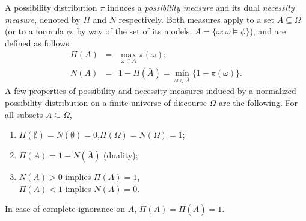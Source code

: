 \documentclass[conference]{IEEEtran}
\begin{document}
A possibility distribution $\pi$ induces a \emph{possibility
measure} and its dual \emph{necessity
measure}, denoted by $\Pi$ and $N$
respectively. Both measures apply to a set $A \subseteq\Omega$ (or to a
formula $\phi$, by way of the set of its models, $A = \{\omega : \omega \models \phi\}$),
and are defined as follows:
\begin{eqnarray}
  \Pi(A) &=& \max_{\omega\in A} \pi(\omega); \\
  N(A)   &=& 1 - \Pi(\bar{A}) = \min_{\omega\in \bar{A}} \{1 - \pi(\omega)\}.
\end{eqnarray}
%
A few properties of possibility and necessity measures 
induced by a normalized possibility distribution on a finite universe of
discourse $\Omega$ are the following. For all subsets $A\subseteq \Omega$,
\begin{enumerate}
  \item $\Pi(\emptyset) = N(\emptyset) = 0$,\quad $\Pi(\Omega) = N(\Omega) = 1$;
  \item $\Pi(A) = 1 - N(\bar{A})$ (duality);
  \item $N(A) > 0$ implies $\Pi(A) = 1$, \\
  \quad $\Pi(A) < 1$ implies $N(A) = 0$.
\end{enumerate}
In case of complete ignorance on $A$, $\Pi(A) = \Pi(\bar{A}) = 1$.
\end{document}
